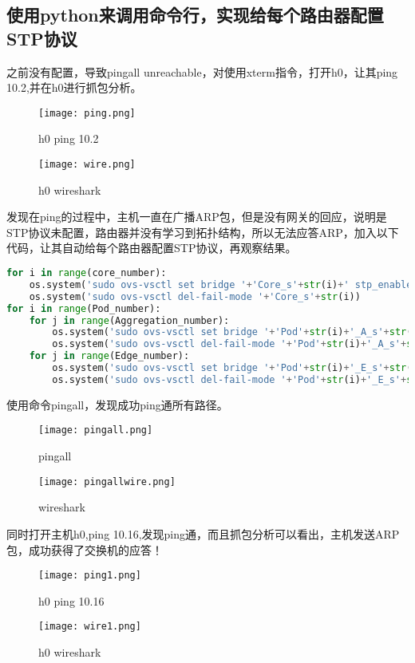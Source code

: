 \documentclass{xjtureport}
\begin{document}
\subsection{使用python来调用命令行，实现给每个路由器配置STP协议}
之前没有配置，导致pingall unreachable，对使用xterm指令，打开h0，让其ping 10.2,并在h0进行抓包分析。
\begin{figure}[H]
	\centering
	\texttt{[image: ping.png]}
	\caption{h0 ping 10.2}
\end{figure}
\begin{figure}[H]
	\centering
	\texttt{[image: wire.png]}
	\caption{h0 wireshark}
\end{figure}
发现在ping的过程中，主机一直在广播ARP包，但是没有网关的回应，说明是STP协议未配置，路由器并没有学习到拓扑结构，所以无法应答ARP，加入以下代码，让其自动给每个路由器配置STP协议，再观察结果。
\begin{lstlisting}[language=Python]
for i in range(core_number): 
	os.system('sudo ovs-vsctl set bridge '+'Core_s'+str(i)+' stp_enable=true')
	os.system('sudo ovs-vsctl del-fail-mode '+'Core_s'+str(i))
for i in range(Pod_number):
	for j in range(Aggregation_number):
		os.system('sudo ovs-vsctl set bridge '+'Pod'+str(i)+'_A_s'+str(j)+' stp_enable=true')
		os.system('sudo ovs-vsctl del-fail-mode '+'Pod'+str(i)+'_A_s'+str(j))
	for j in range(Edge_number):
		os.system('sudo ovs-vsctl set bridge '+'Pod'+str(i)+'_E_s'+str(j)+' stp_enable=true')
		os.system('sudo ovs-vsctl del-fail-mode '+'Pod'+str(i)+'_E_s'+str(j))
\end{lstlisting}
\quad \quad 使用命令pingall，发现成功ping通所有路径。
\begin{figure}[H]
	\centering
	\texttt{[image: pingall.png]}
	\caption{pingall}
\end{figure}
\begin{figure}[H]
	\centering
	\texttt{[image: pingallwire.png]}
	\caption{wireshark}
\end{figure}
同时打开主机h0,ping 10.16,发现ping通，而且抓包分析可以看出，主机发送ARP包，成功获得了交换机的应答！
\begin{figure}[H]
	\centering
	\texttt{[image: ping1.png]}
	\caption{h0 ping 10.16}
\end{figure}
\begin{figure}[H]
	\centering
	\texttt{[image: wire1.png]}
	\caption{h0 wireshark}
\end{figure}
\end{document}
